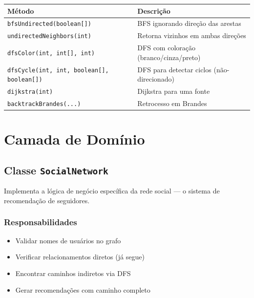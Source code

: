 \documentclass[12pt,a4paper]{article}
\begin{document}
    \begin{table}[h]
        \centering
        \begin{tabular}{|l|l|}
            \hline
            \textbf{Método} & \textbf{Descrição} \\
            \hline
            \texttt{bfsUndirected(boolean[])} & BFS ignorando direção das arestas \\
            \hline
            \texttt{undirectedNeighbors(int)} & Retorna vizinhos em ambas direções \\
            \hline
            \texttt{dfsColor(int, int[], int)} & DFS com coloração (branco/cinza/preto) \\
            \hline
            \texttt{dfsCycle(int, int, boolean[], boolean[])} & DFS para detectar ciclos (não-direcionado) \\
            \hline
            \texttt{dijkstra(int)} & Dijkstra para uma fonte \\
            \hline
            \texttt{backtrackBrandes(...)} & Retrocesso em Brandes \\
            \hline
        \end{tabular}
    \end{table}

    \newpage

    \section{Camada de Domínio}

    \subsection{Classe \texttt{SocialNetwork}}

    Implementa a lógica de negócio específica da rede social — o sistema de recomendação de seguidores.

    \subsubsection{Responsabilidades}

    \begin{itemize}
        \item Validar nomes de usuários no grafo
        \item Verificar relacionamentos diretos (já segue)
        \item Encontrar caminhos indiretos via DFS
        \item Gerar recomendações com caminho completo
    \end{itemize}
\end{document}
